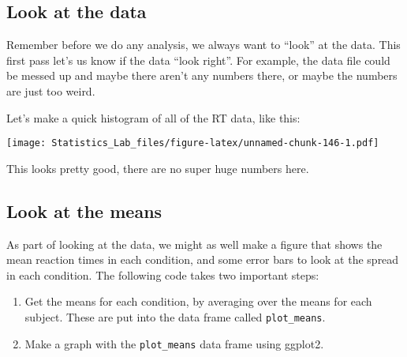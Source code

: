 \documentclass[
]{book}
\newenvironment{Shaded}{\begin{snugshade}}{\end{snugshade}}
\newcommand{\FunctionTok}[1]{\textcolor[rgb]{0.13,0.29,0.53}{\textbf{#1}}}
\newcommand{\NormalTok}[1]{#1}
\newcommand{\SpecialCharTok}[1]{\textcolor[rgb]{0.81,0.36,0.00}{\textbf{#1}}}
\begin{document}
\hypertarget{look-at-the-data-4}{%
\subsection{Look at the data}\label{look-at-the-data-4}}

Remember before we do any analysis, we always want to ``look'' at the
data. This first pass let's us know if the data ``look right''. For
example, the data file could be messed up and maybe there aren't any
numbers there, or maybe the numbers are just too weird.

Let's make a quick histogram of all of the RT data, like this:

\begin{Shaded}
\end{Shaded}

\texttt{[image: Statistics\_Lab\_files/figure-latex/unnamed-chunk-146-1.pdf]}

This looks pretty good, there are no super huge numbers here.

\hypertarget{look-at-the-means-1}{%
\subsection{Look at the means}\label{look-at-the-means-1}}

As part of looking at the data, we might as well make a figure that
shows the mean reaction times in each condition, and some error bars to
look at the spread in each condition. The following code takes two
important steps:

\begin{enumerate}
\def\labelenumi{\arabic{enumi}.}
\item
  Get the means for each condition, by averaging over the means for
  each subject. These are put into the data frame called \texttt{plot\_means}.
\item
  Make a graph with the \texttt{plot\_means} data frame using ggplot2.
\end{enumerate}
\end{document}
